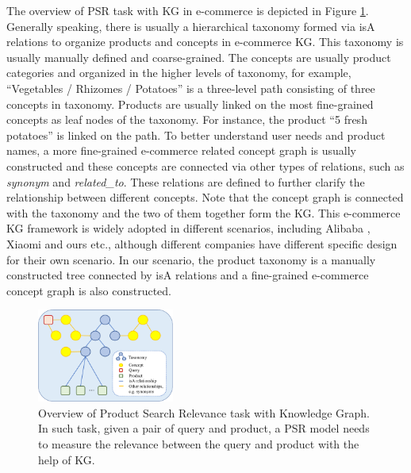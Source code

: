 The overview of PSR task with KG in e-commerce is depicted in Figure \ref{fig:taskoverview}. 
Generally speaking, there is usually a hierarchical taxonomy formed via isA relations to organize products and concepts in e-commerce KG. 
This taxonomy is usually manually defined and coarse-grained. The concepts are usually product categories and organized in the higher levels of taxonomy, for example, ``Vegetables / Rhizomes / Potatoes'' is a three-level path consisting of three concepts in taxonomy. 
Products are usually linked on the most fine-grained concepts as leaf nodes of the taxonomy. 
For instance, the product ``5 fresh potatoes'' is linked on the path.
To better understand user needs and product names, a more fine-grained e-commerce related concept graph is usually constructed and these concepts are connected via other types of relations, such as \textit{synonym} and \textit{related\_to}.
These relations are defined to further clarify the relationship between different concepts. 
Note that the concept graph is connected with the taxonomy and the two of them together form the KG.
This e-commerce KG framework is widely adopted in different scenarios, including Alibaba \cite{luo2020alicoco, luo2021alicoco2}, Xiaomi \cite{xiaomi} and ours etc., although different companies have different specific design for their own scenario. 
In our scenario, the product taxonomy is a manually constructed tree connected by isA relations and a fine-grained e-commerce concept graph is also constructed. 




\begin{figure}[th] \centering
    \includegraphics[width=0.4\textwidth]{task_overview3}
    \caption{Overview of Product Search Relevance task with Knowledge Graph. In such task, given a pair of query and product, a PSR model needs to measure the relevance between the query and product with the help of KG.}
    \label{fig:taskoverview}
\end{figure}

